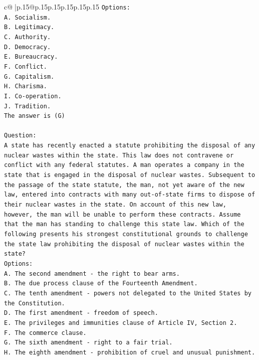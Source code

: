 \documentclass{article}
\begin{document}
{\begin{supertabular}{c@{$\;$}|p{.15\linewidth}@{}p{.15\linewidth}p{.15\linewidth}p{.15\linewidth}p{.15\linewidth}p{.15\linewidth}}
{{{\texttt{Options:} \\
\texttt{A. Socialism.} \\
\texttt{B. Legitimacy.} \\
\texttt{C. Authority.} \\
\texttt{D. Democracy.} \\
\texttt{E. Bureaucracy.} \\
\texttt{F. Conflict.} \\
\texttt{G. Capitalism.} \\
\texttt{H. Charisma.} \\
\texttt{I. Co{-}operation.} \\
\texttt{J. Tradition.} \\
\texttt{The answer is (G)} \\
\\ 
\texttt{Question:} \\
\texttt{A state has recently enacted a statute prohibiting the disposal of any nuclear wastes within the state. This law does not contravene or conflict with any federal statutes. A man operates a company in the state that is engaged in the disposal of nuclear wastes. Subsequent to the passage of the state statute, the man, not yet aware of the new law, entered into contracts with many out{-}of{-}state firms to dispose of their nuclear wastes in the state. On account of this new law, however, the man will be unable to perform these contracts. Assume that the man has standing to challenge this state law. Which of the following presents his strongest constitutional grounds to challenge the state law prohibiting the disposal of nuclear wastes within the state?} \\
\texttt{Options:} \\
\texttt{A. The second amendment {-} the right to bear arms.} \\
\texttt{B. The due process clause of the Fourteenth Amendment.} \\
\texttt{C. The tenth amendment {-} powers not delegated to the United States by the Constitution.} \\
\texttt{D. The first amendment {-} freedom of speech.} \\
\texttt{E. The privileges and immunities clause of Article IV, Section 2.} \\
\texttt{F. The commerce clause.} \\
\texttt{G. The sixth amendment {-} right to a fair trial.} \\
\texttt{H. The eighth amendment {-} prohibition of cruel and unusual punishment.} \\
}}}
\end{supertabular}}
\end{document}
